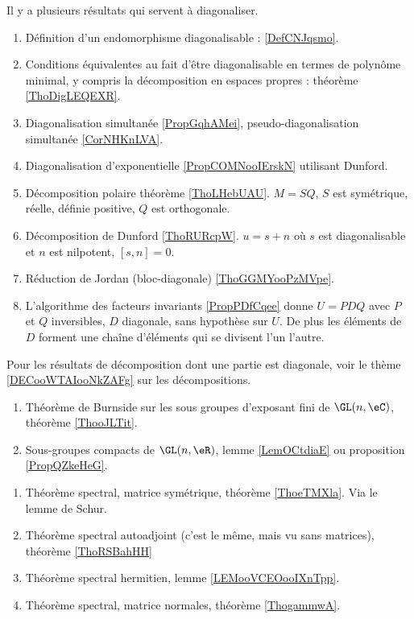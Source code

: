 Il y a plusieurs résultats qui servent à diagonaliser.
    \begin{enumerate}
        \item
            Définition d'un endomorphisme diagonalisable : \ref{DefCNJqsmo}.
        \item
            Conditions équivalentes au fait d'être diagonalisable en termes de polynôme minimal, y compris la décomposition en espaces propres : théorème \ref{ThoDigLEQEXR}.
        \item
            Diagonalisation simultanée \ref{PropGqhAMei}, pseudo-diagonalisation simultanée \ref{CorNHKnLVA}.
        \item
            Diagonalisation d'exponentielle \ref{PropCOMNooIErskN} utilisant Dunford.
        \item
            Décomposition polaire théorème \ref{ThoLHebUAU}. \( M=SQ\), \( S\) est symétrique, réelle, définie positive, \( Q\) est orthogonale.
        \item
            Décomposition de Dunford \ref{ThoRURcpW}. \( u=s+n\) où \( s\) est diagonalisable et \( n\) est nilpotent, \( [s,n]=0\).
        \item 
            Réduction de Jordan (bloc-diagonale) \ref{ThoGGMYooPzMVpe}.
        \item 
            L'algorithme des facteurs invariants \ref{PropPDfCqee} donne \( U=PDQ\) avec \( P\) et \( Q\) inversibles, \( D\) diagonale, sans hypothèse sur \( U\). De plus les éléments de \( D\) forment une chaîne d'éléments qui se divisent l'un l'autre.
        \end{enumerate}

        Pour les résultats de décomposition dont une partie est diagonale, voir le thème \ref{DECooWTAIooNkZAFg} sur les décompositions.

\begin{enumerate}
    \item 
        Théorème de Burnside sur les sous groupes d'exposant fini de \( \GL(n,\eC)\), théorème \ref{ThooJLTit}.
    \item 
        Sous-groupes compacts de \( \GL(n,\eR)\), lemme \ref{LemOCtdiaE} ou proposition \ref{PropQZkeHeG}.
\end{enumerate}

    \begin{enumerate}
        \item
            Théorème spectral, matrice symétrique, théorème \ref{ThoeTMXla}. Via le lemme de Schur.
        \item
            Théorème spectral autoadjoint (c'est le même, mais vu sans matrices), théorème \ref{ThoRSBahHH}
        \item
            Théorème spectral hermitien, lemme \ref{LEMooVCEOooIXnTpp}.
        \item
            Théorème spectral, matrice normales, théorème \ref{ThogammwA}.
        \end{enumerate}

